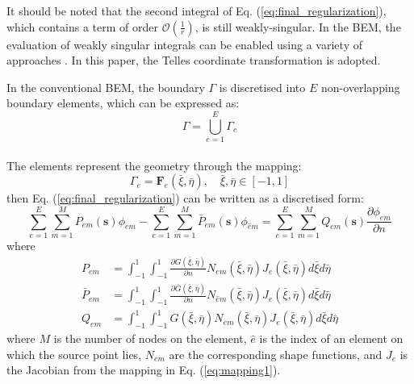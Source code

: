 \documentclass[review]{elsarticle}
\begin{document}
It should be noted that the second integral of Eq. (\ref{eq:final_regularization}), which contains a term of order $\mathcal{O}\left(\frac{1}{r}\right)$, is still weakly-singular. In the BEM, the evaluation of weakly singular integrals can be enabled using a variety of approaches \cite{Stroud}. In this paper, the Telles coordinate transformation \cite{Telles} is adopted. 

In the conventional BEM, the boundary $\Gamma$ is discretised into $E$ non-overlapping boundary elements, which can be expressed as:
\begin{equation}
\Gamma=\bigcup_{e=1}^E\Gamma_e
\label{eq:sub_boundary}
\end{equation}
\\The elements represent the geometry through the mapping:
\begin{equation}
\Gamma_e=\mathbf{F}_e(\bar{\xi},\bar{\eta}), \quad\bar{\xi},\bar{\eta}\in[-1,1]
\label{eq:mapping1}
\end{equation}
then Eq. (\ref{eq:final_regularization}) can be written as a discretised form:
\begin{equation}
\sum_{e=1}^{E}\sum_{m=1}^{M} P_{em}(\mathbf{s})\phi_{em} - \sum_{e=1}^{E}\sum_{m=1}^{M} \bar{P}_{em}(\mathbf{s})\phi_{\hat{e}m} =\sum_{e=1}^{E}\sum_{m=1}^{M} Q_{em}(\mathbf{s})\frac{\partial\phi_{em}}{\partial n}
\label{eq:discretise}
\end{equation}
where 
\begin{align}
P_{em} &= \int_{-1}^1\int_{-1}^1 \frac{\partial{G(\bar{\xi},\bar{\eta})}}{\partial n} N_{em}(\bar{\xi},\bar{\eta}) J_{e}(\bar{\xi},\bar{\eta}) d\bar{\xi} d\bar{\eta}\label{eq:BemDiscretise1}  \\
\bar{P}_{em} &= \int_{-1}^1\int_{-1}^1 \frac{\partial{\bar{G}(\bar{\xi},\bar{\eta})}}{\partial n} N_{\hat{e}m}(\bar{\xi},\bar{\eta}) J_{e}(\bar{\xi},\bar{\eta}) d\bar{\xi} d\bar{\eta}\label{eq:BemDiscretise2}  \\
Q_{em} &= \int_{-1}^1\int_{-1}^1 G(\bar{\xi},\bar{\eta}) N_{em}(\bar{\xi},\bar{\eta}) J_{e}(\bar{\xi},\bar{\eta}) d\bar{\xi} d\bar{\eta} 
\label{eq:BemDiscretise3}
\end{align}
where $M$ is the number of nodes on the element, $\hat{e}$ is the index of an element on which the source point lies, $N_{em}$ are the corresponding shape functions, and $J_{e}$ is the Jacobian from the mapping in Eq. (\ref{eq:mapping1}).
\end{document}
